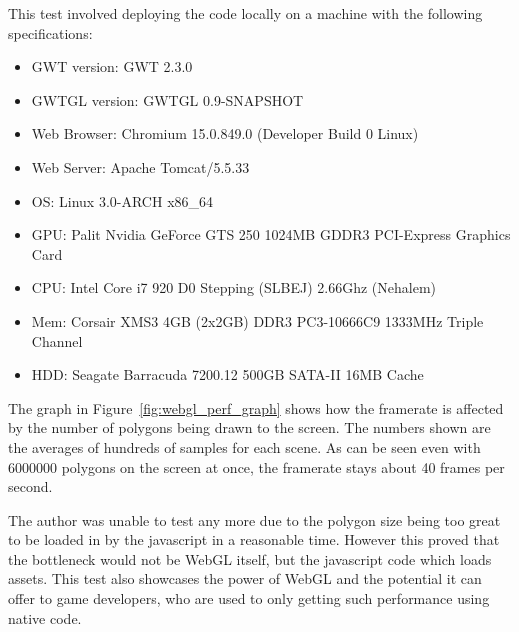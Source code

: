 This test involved deploying the code locally on a machine with the following specifications:
\begin{itemize}
	\item GWT version: GWT 2.3.0
	\item GWTGL version: GWTGL 0.9-SNAPSHOT
	\item Web Browser: Chromium 15.0.849.0 (Developer Build 0 Linux)
	\item Web Server: Apache Tomcat/5.5.33
	\item OS: Linux 3.0-ARCH x86\_64
	\item GPU: Palit Nvidia GeForce GTS 250 1024MB GDDR3 PCI-Express Graphics Card
	\item CPU: Intel Core i7 920 D0 Stepping (SLBEJ) 2.66Ghz (Nehalem)
	\item Mem: Corsair XMS3 4GB (2x2GB) DDR3 PC3-10666C9 1333MHz Triple Channel
	\item HDD: Seagate Barracuda 7200.12 500GB SATA-II 16MB Cache
\end{itemize}

The graph in Figure~\ref{fig:webgl_perf_graph} shows how the framerate is affected by the number of polygons being drawn to the screen.
The numbers shown are the averages of hundreds of samples for each scene.
As can be seen even with 6000000 polygons on the screen at once, the framerate stays about 40 frames per second.

The author was unable to test any more due to the polygon size being too great to be loaded in by the javascript in a reasonable time.
However this proved that the bottleneck would not be WebGL itself, but the javascript code which loads assets.
This test also showcases the power of WebGL and the potential it can offer to game developers, who are used to only getting such performance using native code.

